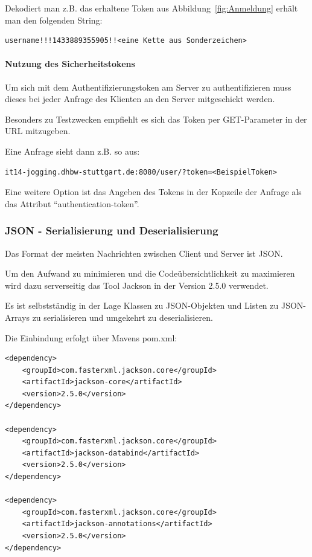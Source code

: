 Dekodiert man z.B.  das erhaltene Token aus Abbildung~\ref{fig:Anmeldung} erhält man den folgenden String:
\begin{lstlisting}
username!!!1433889355905!!<eine Kette aus Sonderzeichen>
\end{lstlisting}
\paragraph{Nutzung des Sicherheitstokens}
Um sich mit dem Authentifizierungstoken am Server zu authentifizieren muss dieses bei jeder Anfrage des Klienten an den Server mitgeschickt werden.

Besonders zu Testzwecken empfiehlt es sich das Token per GET-Parameter in der URL mitzugeben. 

Eine Anfrage sieht dann z.B. so aus:
\begin{lstlisting}
it14-jogging.dhbw-stuttgart.de:8080/user/?token=<BeispielToken>
\end{lstlisting}

Eine weitere Option ist das Angeben des Tokens in der Kopzeile der Anfrage als das Attribut  ``authentication-token''.
\subsubsection{JSON - Serialisierung und Deserialisierung}\label{jackson}
Das Format der meisten Nachrichten zwischen Client und Server ist JSON.

Um den Aufwand zu minimieren und die Codeübersichtlichkeit zu maximieren wird dazu serverseitig das Tool Jackson in der Version 2.5.0 verwendet.

Es ist selbstständig in der Lage Klassen zu JSON-Objekten und Listen zu JSON-Arrays zu serialisieren und umgekehrt zu deserialisieren.

Die Einbindung erfolgt über Mavens pom.xml:
\lstset{language=xml}
\begin{lstlisting}[frame=htrbl, caption={Ausschnitt aus pom.xml}, breaklines=true]
<dependency>
	<groupId>com.fasterxml.jackson.core</groupId>
	<artifactId>jackson-core</artifactId>
	<version>2.5.0</version>
</dependency>

<dependency>
	<groupId>com.fasterxml.jackson.core</groupId>
	<artifactId>jackson-databind</artifactId>
	<version>2.5.0</version>
</dependency>

<dependency>
	<groupId>com.fasterxml.jackson.core</groupId>
	<artifactId>jackson-annotations</artifactId>
	<version>2.5.0</version>
</dependency>
\end{lstlisting}

